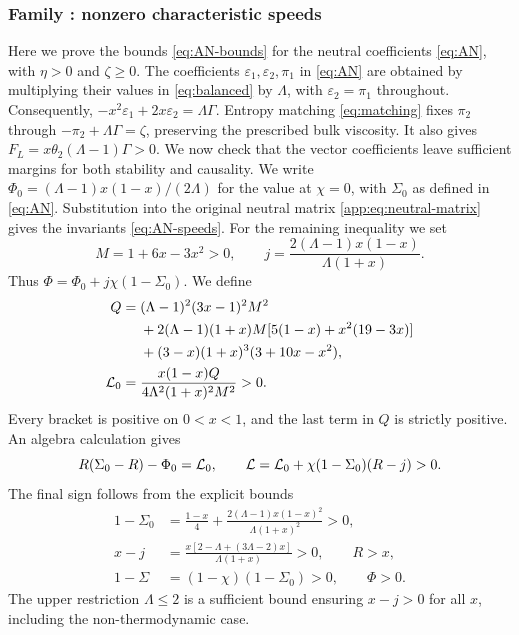 \subsubsection*{Family : nonzero characteristic speeds}
\label{app:sec:charged-nonzero-conformal}
Here we prove the bounds \eqref{eq:AN-bounds} for the neutral coefficients
\eqref{eq:AN}, with $\eta>0$ and $\zeta\geq0$. The coefficients
$\varepsilon_1,\varepsilon_2,\pi_1$ in \eqref{eq:AN} are obtained by
multiplying their values in \eqref{eq:balanced} by $\Lambda$, with
$\varepsilon_2=\pi_1$ throughout. Consequently,
$-x^2\varepsilon_1+2x\varepsilon_2=\Lambda\Gamma$.
Entropy matching \eqref{eq:matching} fixes $\pi_2$ through
$-\pi_2+\Lambda\Gamma=\zeta$, preserving the prescribed bulk viscosity.
It also gives $F_L=x\theta_2(\Lambda-1)\Gamma>0$.
We now check that the vector coefficients leave sufficient margins for
both stability and causality. We write
$\Phi_0=(\Lambda-1)x(1-x)/(2\Lambda)$ for the value at $\chi=0$,
with $\Sigma_0$ as defined in \eqref{eq:AN}. Substitution into the original neutral matrix
\eqref{app:eq:neutral-matrix} gives the invariants \eqref{eq:AN-speeds}.
For the remaining inequality we set
\begin{equation}
 M=1+6x-3x^2>0,\qquad
 j=\frac{2(\Lambda-1)x(1-x)}{\Lambda(1+x)}.
\end{equation}
Thus $\Phi=\Phi_0+j\chi(1-\Sigma_0)$.
We define
\begin{align}\label{app:eq:charged-AN-positive-Q}
 Q={}&(\Lambda-1)^2(3x-1)^2M^2\nonumber\\
 &+2(\Lambda-1)(1+x)M[5(1-x)+x^2(19-3x)]\nonumber\\
 &+(3-x)(1+x)^3(3+10x-x^2),\\
 \mathcal L_0={}&\frac{x(1-x)Q}{4\Lambda^2(1+x)^2M^2}>0.\nonumber
\end{align}
Every bracket is positive on $0<x<1$, and the last term in $Q$
is strictly positive. An algebra calculation gives
\begin{equation}\label{app:eq:charged-AN-positive-L}
 R(\Sigma_0-R)-\Phi_0=\mathcal L_0,\qquad
 \mathcal L
   =\mathcal L_0+\chi(1-\Sigma_0)(R-j)>0.
\end{equation}
The final sign follows from the explicit bounds
\begin{align}
 1-\Sigma_0&=\frac{1-x}{4}
     +\frac{2(\Lambda-1)x(1-x)^2}{\Lambda(1+x)^2}>0,\\
 x-j&=\frac{x[2-\Lambda+(3\Lambda-2)x]}{\Lambda(1+x)}>0,
 \qquad R>x,\nonumber\\
 1-\Sigma&=(1-\chi)(1-\Sigma_0)>0,\qquad \Phi>0.\nonumber
\end{align}
The upper restriction $\Lambda\leq2$ is a sufficient bound ensuring
$x-j>0$ for all $x$, including the non-thermodynamic case.

